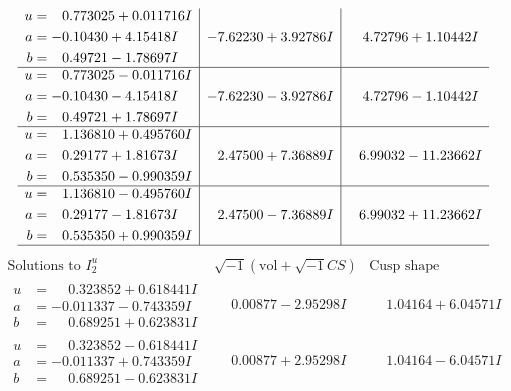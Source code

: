 \documentclass[1p]{elsarticle_modified}
\theoremstyle{definition}
\newcommand{\I}{\sqrt{-1}}
\begin{document}
$$\begin{array}{c|c|c}
\begin{aligned}
u &= \phantom{-}0.773025 + 0.011716 I \\
a &= -0.10430 + 4.15418 I \\
b &= \phantom{-}0.49721 - 1.78697 I\end{aligned}
 & -7.62230 + 3.92786 I & \phantom{-}4.72796 + 1.10442 I \\ \hline\begin{aligned}
u &= \phantom{-}0.773025 - 0.011716 I \\
a &= -0.10430 - 4.15418 I \\
b &= \phantom{-}0.49721 + 1.78697 I\end{aligned}
 & -7.62230 - 3.92786 I & \phantom{-}4.72796 - 1.10442 I \\ \hline\begin{aligned}
u &= \phantom{-}1.136810 + 0.495760 I \\
a &= \phantom{-}0.29177 + 1.81673 I \\
b &= \phantom{-}0.535350 - 0.990359 I\end{aligned}
 & \phantom{-}2.47500 + 7.36889 I & \phantom{-}6.99032 - 11.23662 I \\ \hline\begin{aligned}
u &= \phantom{-}1.136810 - 0.495760 I \\
a &= \phantom{-}0.29177 - 1.81673 I \\
b &= \phantom{-}0.535350 + 0.990359 I\end{aligned}
 & \phantom{-}2.47500 - 7.36889 I & \phantom{-}6.99032 + 11.23662 I\\
 \hline 
 \end{array}$$\newpage$$\begin{array}{c|c|c}  
\text{Solutions to }I^u_{2}& \I (\text{vol} + \sqrt{-1}CS) & \text{Cusp shape}\\
 \hline 
\begin{aligned}
u &= \phantom{-}0.323852 + 0.618441 I \\
a &= -0.011337 - 0.743359 I \\
b &= \phantom{-}0.689251 + 0.623831 I\end{aligned}
 & \phantom{-}0.00877 - 2.95298 I & \phantom{-}1.04164 + 6.04571 I \\ \hline\begin{aligned}
u &= \phantom{-}0.323852 - 0.618441 I \\
a &= -0.011337 + 0.743359 I \\
b &= \phantom{-}0.689251 - 0.623831 I\end{aligned}
 & \phantom{-}0.00877 + 2.95298 I & \phantom{-}1.04164 - 6.04571 I \\ \hline\begin{aligned}

\end{aligned}
\end{array}$$
\end{document}
